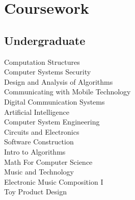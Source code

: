 \documentclass[letterpaper]{deedy-resume} %
\begin{document}
\begin{minipage}[t]{0.33\textwidth}
\sectionspace %


\section{Coursework}





\subsection{Undergraduate}

Computation Structures \\					%
Computer Systems Security \\				%
Design and Analysis of Algorithms \\		%
Communicating with Mobile Technology \\		%
Digital Communication Systems \\			%
Artificial Intelligence \\					%
Computer System Engineering \\				%
Circuits and Electronics \\					%
Software Construction \\					%
Intro to Algorithms \\						%
Math For Computer Science \\				%
Music and Technology \\						%
Electronic Music Composition I \\			%
Toy Product Design 							%


\end{minipage}
\end{document}
